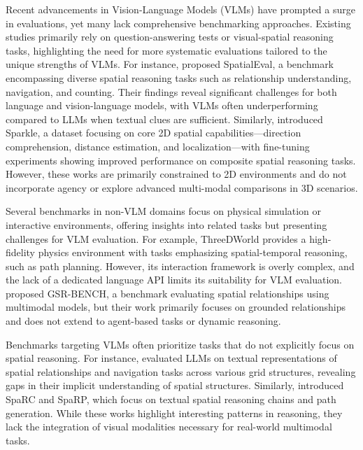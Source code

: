 Recent advancements in Vision-Language Models (VLMs) have prompted a surge in evaluations, yet many lack comprehensive benchmarking approaches. Existing studies primarily rely on question-answering tests or visual-spatial reasoning tasks, highlighting the need for more systematic evaluations tailored to the unique strengths of VLMs. For instance, \citet{DBLP:journals/corr/abs-2406-14852} proposed SpatialEval, a benchmark encompassing diverse spatial reasoning tasks such as relationship understanding, navigation, and counting. Their findings reveal significant challenges for both language and vision-language models, with VLMs often underperforming compared to LLMs when textual clues are sufficient. Similarly, \citet{DBLP:journals/corr/abs-2410-16162} introduced Sparkle, a dataset focusing on core 2D spatial capabilities—direction comprehension, distance estimation, and localization—with fine-tuning experiments showing improved performance on composite spatial reasoning tasks. However, these works are primarily constrained to 2D environments and do not incorporate agency or explore advanced multi-modal comparisons in 3D scenarios.

Several benchmarks in non-VLM domains focus on physical simulation or interactive environments, offering insights into related tasks but presenting challenges for VLM evaluation. For example, ThreeDWorld \cite{DBLP:journals/corr/abs-2310-03249} provides a high-fidelity physics environment with tasks emphasizing spatial-temporal reasoning, such as path planning. However, its interaction framework is overly complex, and the lack of a dedicated language API limits its suitability for VLM evaluation. \citet{DBLP:journals/corr/abs-2308-09778} proposed GSR-BENCH, a benchmark evaluating spatial relationships using multimodal models, but their work primarily focuses on grounded relationships and does not extend to agent-based tasks or dynamic reasoning.

Benchmarks targeting VLMs often prioritize tasks that do not explicitly focus on spatial reasoning. For instance, \citet{DBLP:journals/tmlr/YamadaBLKY24} evaluated LLMs on textual representations of spatial relationships and navigation tasks across various grid structures, revealing gaps in their implicit understanding of spatial structures. Similarly, \citet{DBLP:conf/acl/RizviZG24} introduced SpaRC and SpaRP, which focus on textual spatial reasoning chains and path generation. While these works highlight interesting patterns in reasoning, they lack the integration of visual modalities necessary for real-world multimodal tasks.


